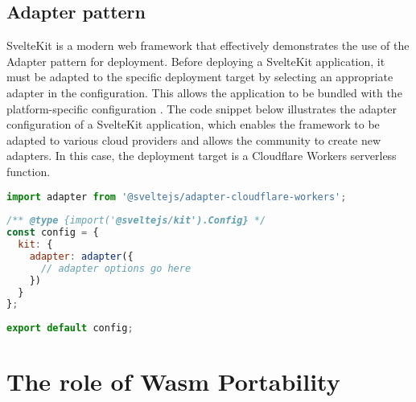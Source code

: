 \subsection{Adapter pattern}
SvelteKit is a modern web framework that effectively demonstrates the use of the Adapter pattern for deployment. Before deploying a SvelteKit application, it must be adapted to the specific deployment target by selecting an appropriate adapter in the configuration. This allows the application to be bundled with the platform-specific configuration \cite{sveltecommunity_2023_adapter}. 
The code snippet below illustrates the adapter configuration of a SvelteKit application, which enables the framework to be adapted to various cloud providers and allows the community to create new adapters. In this case, the deployment target is a Cloudflare Workers \gls{serverless} function.

\begin{lstlisting}[frame=lines, caption=svelte.config.js SvelteKit adapter configuration, captionpos=b, language=JavaScript, showstringspaces=false]
import adapter from '@sveltejs/adapter-cloudflare-workers';
 
/** @type {import('@sveltejs/kit').Config} */
const config = {
  kit: {
    adapter: adapter({
      // adapter options go here
    })
  }
};
 
export default config;
\end{lstlisting}

\section{The role of Wasm Portability}